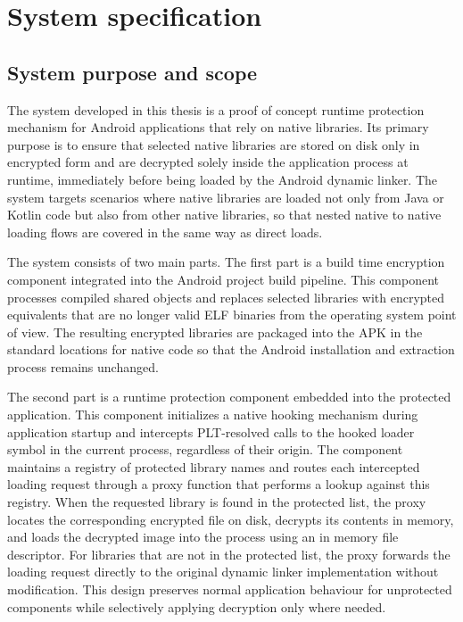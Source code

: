 \documentclass[11pt,a4paper]{report}
\renewcommand\_{{\textunderscore\allowbreak}}
\begin{document}
\newpage

\section{System specification}
\label{sec:spec}

\subsection{System purpose and scope}

The system developed in this thesis is a proof of concept runtime protection mechanism for Android applications that rely on native libraries. Its primary purpose is to ensure that selected native libraries are stored on disk only in encrypted form and are decrypted solely inside the application process at runtime, immediately before being loaded by the Android dynamic linker. The system targets scenarios where native libraries are loaded not only from Java or Kotlin code but also from other native libraries, so that nested native to native loading flows are covered in the same way as direct loads.

The system consists of two main parts. The first part is a build time encryption component integrated into the Android project build pipeline. This component processes compiled shared objects and replaces selected libraries with encrypted equivalents that are no longer valid ELF binaries from the operating system point of view. The resulting encrypted libraries are packaged into the APK in the standard locations for native code so that the Android installation and extraction process remains unchanged.

The second part is a runtime protection component embedded into the protected application. This component initializes a native hooking mechanism during application startup and intercepts PLT-resolved calls to the hooked loader symbol in the current process, regardless of their origin. The component maintains a registry of protected library names and routes each intercepted loading request through a proxy function that performs a lookup against this registry. When the requested library is found in the protected list, the proxy locates the corresponding encrypted file on disk, decrypts its contents in memory, and loads the decrypted image into the process using an in memory file descriptor. For libraries that are not in the protected list, the proxy forwards the loading request directly to the original dynamic linker implementation without modification. This design preserves normal application behaviour for unprotected components while selectively applying decryption only where needed.
\end{document}
